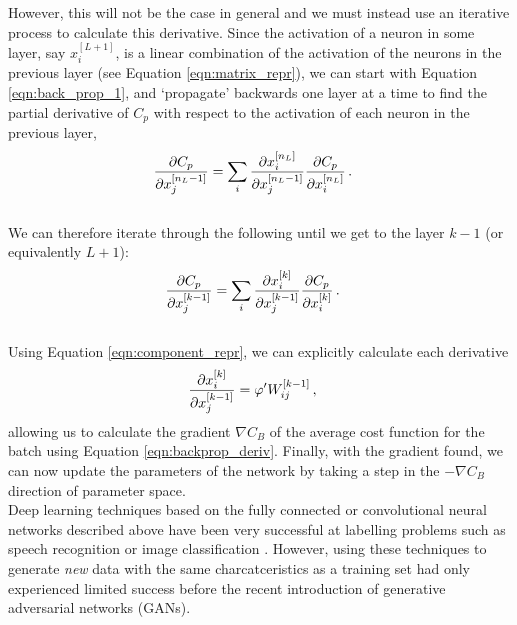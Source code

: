 \documentclass[11pt,a4paper,onecolumn]{report}
\begin{document}
However, this will not be the case in general and we must instead use an
iterative process to calculate this derivative. Since the activation of a neuron
in some layer, say \(x_i^{[L+1]}\), is a linear combination of the activation of
the neurons in the previous layer (see Equation \ref{eqn:matrix_repr}), we can
start with Equation \ref{eqn:back_prop_1}, and `propagate' backwards one layer
at a time to find the partial derivative of \(C_p\) with respect to the
activation of each neuron in the previous layer,
\begin{align}
  \partialderivative{C_p}{x_j^{[n_L - 1]}}
  &= \sum\limits_i \partialderivative{x_i^{[n_L]}}{x_j^{[n_L - 1]}}
  \partialderivative{C_p}{x_i^{[n_L]}} \,.
  \label{eqn:back_prop_2}
\end{align}
\\

\noindent We can therefore iterate through the following until we get to the layer
\(k-1\) (or equivalently \(L+1\)):
\begin{align}
  \partialderivative{C_p}{x_j^{[k - 1]}}
  &= \sum\limits_i \partialderivative{x_i^{[k]}}{x_j^{[k - 1]}}
  \partialderivative{C_p}{x_i^{[k]}}\,.
  \label{eqn:back_prop_3}
\end{align}
\\

\noindent Using Equation \ref{eqn:component_repr}, we can explicitly calculate each derivative
\begin{align}
  \partialderivative{x_i^{[k]}}{x_j^{[k - 1]}}
  &= \varphi'W_{ij}^{[k-1]}\,,
\end{align}
allowing us to calculate the gradient \(\nabla C_B\) of the average cost
function for the batch using Equation \ref{eqn:backprop_deriv}. Finally, with
the gradient found, we can now update the parameters of the network by taking a
step in the \(-\nabla C_B\) direction of parameter space. \\

Deep learning techniques based on the fully connected or convolutional neural
networks described above have been very successful at labelling problems such as
speech recognition \citep{Hinton2012} or image classification
\citep{Krizhevsky2012}. However, using these techniques to generate \textit{new}
data with the same charcatceristics as a training set had only experienced
limited success before the recent introduction of generative adversarial
networks (GANs).\\
\end{document}
